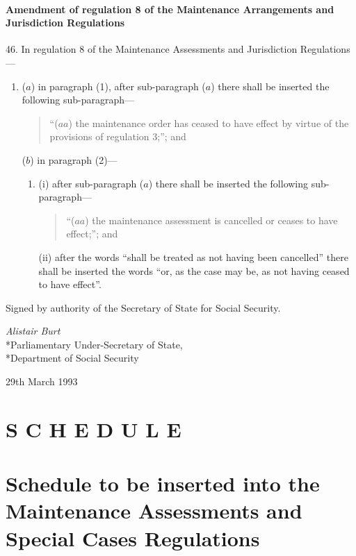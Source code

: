 \documentclass[12pt,a4paper]{article}
\begin{document}
\subsection[46. Amendment of regulation 8 of the Maintenance Arrangements and Jurisdiction Regulations]{Amendment of regulation 8 of the Maintenance Arrangements and Jurisdiction Regulations}

46.  In regulation 8 of the Maintenance Assessments and Jurisdiction Regulations—
\begin{enumerate}\item[]
($a$) in paragraph (1), after sub-paragraph ($a$) there shall be inserted the following sub-paragraph---
\begin{quotation}
“($aa$) the maintenance order has ceased to have effect by virtue of the provisions of regulation 3;”; and
\end{quotation}

($b$) in paragraph (2)---
\begin{enumerate}\item[]
(i) after sub-paragraph ($a$) there shall be inserted the following sub-paragraph---
\begin{quotation}
“($aa$) the maintenance assessment is cancelled or ceases to have effect;”; and
\end{quotation}

(ii) after the words “shall be treated as not having been cancelled” there shall be inserted the words “or, as the case may be, as not having ceased to have effect”.
\end{enumerate}
\end{enumerate}

\bigskip

Signed by authority of the Secretary of State for Social Security.

{\raggedleft
\emph{Alistair Burt}\\*Parliamentary Under-Secretary of State,\\*Department of Social Security

}

29th March 1993

\clearpage

\part*{S C H E D U L E}

\renewcommand\parthead{--- Schedule}

\part[Schedule --- Schedule to be inserted into the Maintenance Assessments and Special Cases Regulations]{Schedule to be inserted into the Maintenance Assessments and Special Cases Regulations}
\end{document}
